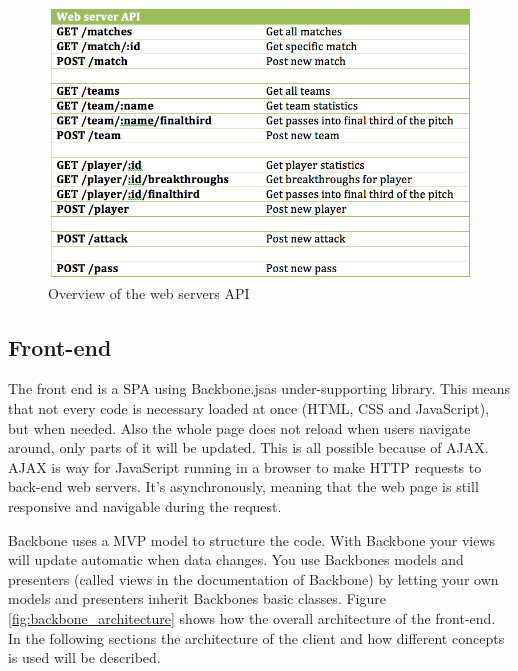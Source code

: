 \begin{figure}[ht!]
\centering
\includegraphics[width=1\textwidth]{images/implementation/API.png}
\caption{Overview of the web servers API}
\label{fig:api}
\end{figure}

\subsection{Front-end}

The front end is a \ac{SPA} \cite{} using Backbone.js\footnotemark as under-supporting library. This means that not every code is necessary loaded at once (\ac{HTML}, \ac{CSS} and JavaScript), but when needed. Also the whole page does not reload when users navigate around, only parts of it will be updated. This is all possible because of \ac{AJAX}. \ac{AJAX} is way for JavaScript running in a browser to make HTTP requests to back-end web servers. It’s asynchronously, meaning that the web page is still responsive and navigable during the request\cite{ajax}.

Backbone uses a \ac{MVP} model to structure the code. With Backbone your views will update automatic when data changes. You use Backbones models and presenters (called views in the documentation of Backbone) by letting your own models and presenters inherit Backbones basic classes. Figure \ref{fig:backbone_architecture} shows how the overall architecture of the front-end. In the following sections the architecture of the client and how different concepts is used will be described. 


